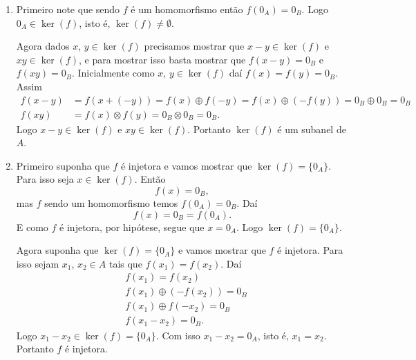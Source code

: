 \begin{prova}
    \begin{enumerate}[label={\roman*})]
        \item Primeiro note que sendo $f$ é um homomorfismo então $f(0_A) = 0_B$. Logo $0_A \in \ker(f)$, isto é, $\ker(f) \ne \emptyset$.

        Agora dados $x$, $y \in \ker(f)$ precisamos mostrar que $x - y \in \ker(f)$ e $xy \in \ker(f)$, e para mostrar isso basta mostrar que $f(x - y) = 0_B$ e$f(xy) = 0_B$.
        Inicialmente como $x$, $y \in \ker(f)$ daí $f(x) = f(y) = 0_B$. Assim
        \begin{align*}
            f(x - y) &= f(x + (-y)) = f(x) \oplus f(-y) = f(x) \oplus (-f(y)) = 0_B \oplus 0_B = 0_B\\
            f(xy) &= f(x)\otimes f(y) = 0_B \otimes 0_B = 0_B.
        \end{align*}
        Logo $x - y \in \ker(f)$ e $xy \in \ker(f)$. Portanto $\ker(f)$ é um subanel de $A$.

        \item Primeiro suponha que $f$ é injetora e vamos mostrar que $\ker(f) = \{0_A\}$. Para isso seja $x \in \ker(f)$. Então
        \[
            f(x) = 0_B,
        \]
        mas $f$ sendo um homomorfismo temos $f(0_A) = 0_B$. Daí
        \[
            f(x) = 0_B = f(0_A).
        \]
        E como $f$ é injetora, por hip\'otese, segue que $x = 0_A$. Logo $\ker(f) = \{0_A\}$.

        Agora suponha que $\ker(f) = \{0_A\}$ e vamos mostrar que $f$ é injetora. Para isso sejam $x_1$, $x_2 \in A$ tais que $f(x_1) = f(x_2)$. Daí
        \begin{align*}
            &f(x_1) = f(x_2)\\
            &f(x_1) \oplus (-f(x_2)) = 0_B\\
            &f(x_1) \oplus f(-x_2) = 0_B\\
            &f(x_1 - x_2) = 0_B.
        \end{align*}
        Logo $x_1 - x_2 \in \ker(f) = \{0_A\}$. Com isso $x_1 - x_2 = 0_A$, isto é, $x_1 = x_2$. Portanto $f$ é injetora.
    \end{enumerate}
\end{prova}

